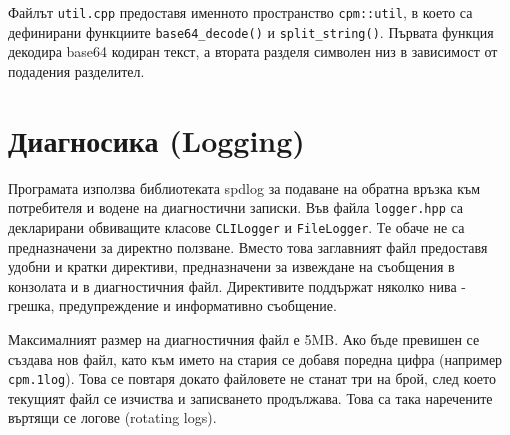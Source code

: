 





Файлът \texttt{util.cpp} предоставя именното пространство \texttt{cpm::util}, в
което са дефинирани функциите \texttt{base64\_decode()} и
\texttt{split\_string()}. Първата функция декодира base64 кодиран текст, а
втората разделя символен низ в зависимост от подадения разделител.


\section{Диагносика (Logging)}

Програмата използва библиотеката spdlog за подаване на обратна връзка към
потребителя и водене на диагностични записки. Във файла \texttt{logger.hpp}
 са декларирани обвиващите класове \texttt{CLILogger} и
\texttt{FileLogger}. Те обаче не са предназначени за директно ползване. Вместо
това заглавният файл предоставя удобни и кратки директиви, предназначени за
извеждане на съобщения в конзолата и в диагностичния файл. Директивите поддържат
няколко нива - грешка, предупреждение и информативно съобщение.

Максималният размер на диагностичния файл е 5MB. Ако бъде превишен се създава
нов файл, като към името на стария се добавя поредна цифра (например
\texttt{cpm.1log}). Това се повтаря докато файловете не станат три на брой, след
което текущият файл се изчиства и записването продължава. Това са така
наречените въртящи се логове (rotating logs).

